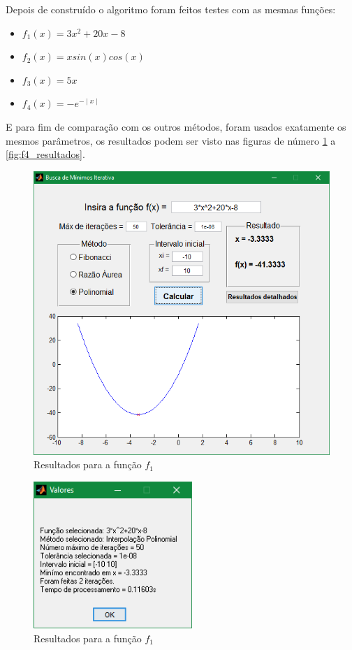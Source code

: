 Depois de construído o algoritmo foram feitos testes com as mesmas funções:

\begin{itemize}
	\item $ f_1(x) = 3x^2 + 20x - 8 $
	\item $ f_2(x) = xsin(x)cos(x) $
	\item $ f_3(x) = 5x $
	\item $ f_4(x) = -e^{-\mid x \mid} $
\end{itemize}

E para fim de comparação com os outros métodos, foram usados exatamente os mesmos parâmetros, os resultados podem ser visto nas figuras de número \ref{fig:f1_gui} a \ref{fig:f4_resultados}.
\\
\begin{figure}[H]
	\begin{center}	
		\includegraphics[width=14cm]{../interpol/f1_gui.PNG}
		\caption{Resultados para a função $f_1$}
		\label{fig:f1_gui}
	\end{center}
\end{figure}

\begin{figure}[H]
	\begin{center}	
		\includegraphics[width=6cm]{../interpol/f1_resultados.PNG}
		\caption{Resultados para a função $f_1$}
		\label{fig:f1_resultados}
	\end{center}
\end{figure}


